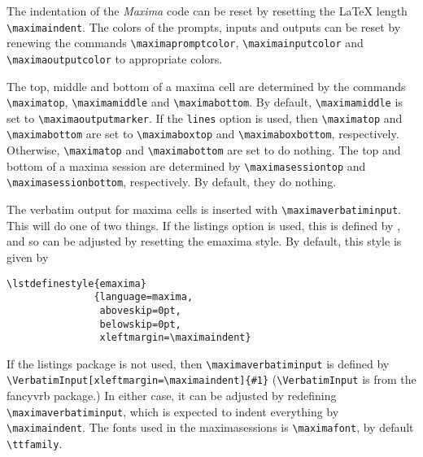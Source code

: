 \documentclass{article}
\newcommand{\mx}{\textsl{\sffamily Maxima}}
\begin{document}
The indentation of the \mx{} code can be reset by resetting the
\LaTeX{} length \verb+\maximaindent+.
The colors of the prompts, inputs and outputs can be reset by renewing
the commands \verb+\maximapromptcolor+, \verb+\maximainputcolor+
and \verb+\maximaoutputcolor+ to appropriate colors.

The top, middle and bottom of a maxima cell are determined by the
commands \verb+\maximatop+, \verb+\maximamiddle+ and \verb+\maximabottom+.
By default, \verb+\maximamiddle+ is set to \verb+\maximaoutputmarker+.
If the \texttt{lines} option is used, then \verb+\maximatop+ and 
\verb+\maximabottom+ are set to \verb+\maximaboxtop+ and
\verb+\maximaboxbottom+,  respectively.
Otherwise, \verb+\maximatop+ and \verb+\maximabottom+ are set to do nothing.
The top and bottom of a maxima session are determined by
\verb+\maximasessiontop+ and \verb+\maximasessionbottom+, respectively.
By default, they do nothing.

The verbatim output for maxima cells is inserted with
\verb+\maximaverbatiminput+.  This will do one of two things.
If the listings option is used, this is defined by
\verb++, and so can be adjusted by
resetting the emaxima style.   By default, this style is given by
\begin{verbatim}
\lstdefinestyle{emaxima}
               {language=maxima,
                aboveskip=0pt,
                belowskip=0pt,
                xleftmargin=\maximaindent}
\end{verbatim}
\noindent
If the listings package is not used, then \verb+\maximaverbatiminput+ is 
defined by \verb+\VerbatimInput[xleftmargin=\maximaindent]{#1}+
(\verb+\VerbatimInput+ is from the fancyvrb package.)
In either case, it can be adjusted by redefining
\verb+\maximaverbatiminput+, which is expected to indent everything by
\verb+\maximaindent+.
The fonts used in the maximasessions is \verb+\maximafont+, by default
\verb+\ttfamily+.
\end{document}
